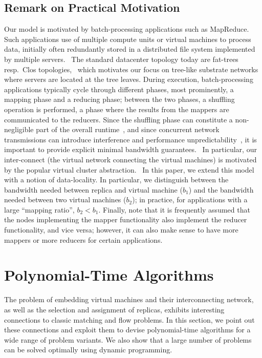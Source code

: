 \documentclass[9pt,twocolumn]{scrartcl}
\newcommand{\CostTrans}{\ensuremath{b_1}}
\newcommand{\CostCom}{\ensuremath{b_2}}
\begin{document}

\subsection{Remark on Practical Motivation}

Our model is motivated by batch-processing applications such as MapReduce.
Such applications use of multiple compute units or virtual machines to
process data, initially often redundantly stored in a distributed file system implemented
by multiple servers.~\cite{mapreduce}
The standard datacenter topology today are fat-trees resp.~Clos topologies,~\cite{fattree}
which motivates our focus on tree-like substrate networks where servers are located at the
tree leaves.
During execution, batch-processing applications typically cycle through different phases,
most prominently, a mapping phase and a reducing phase; between the two phases,
a shuffling operation is performed, a phase where the results from the mappers
are communicated to the reducers. Since the shuffling phase can constitute a
non-negligible part of the overall runtime~\cite{orchestra},
and since concurrent network transmissions can introduce interference and
performance unpredictability~\cite{amazonbw}, it is important
to provide explicit minimal bandwidth guarantees.~\cite{talk-about}
In particular, our inter-connect (the virtual network connecting the virtual machines)
is motivated by the popular virtual cluster abstraction.~\cite{oktopus,talk-about,proteus}
In this paper, we extend this model with a notion of data-locality.
In particular, we distinguish between the bandwidth needed between replica
and virtual machine ($\CostTrans$) and the bandwidth needed between
two virtual machines ($\CostCom$); in practice, for applications with a large
``mapping ratio'', $\CostCom<\CostTrans$. Finally, note that it is frequently assumed
that the nodes implementing the mapper functionality also implement the reducer functionality,
and vice versa; however, it can also make sense to have more mappers or more reducers for
certain applications.

\section{Polynomial-Time Algorithms}\label{sec:poly}

The problem of embedding virtual machines and their interconnecting network,
as well as the selection and assignment of replicas,
exhibits interesting connections to classic matching and
flow problems. In this section, we point out these connections and
exploit them to devise polynomial-time algorithms for a wide range
of problem variants. We also show that a large number of problems
can be solved optimally using dynamic programming.
\end{document}
